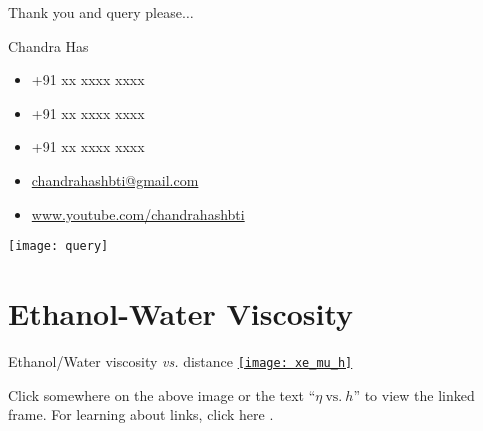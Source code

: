 \documentclass{beamer}
\begin{document}
\begin{frame}{Thank you and query please$\ldots$} 
	\hfill 
	\begin{minipage}[b]{0.5\linewidth}   
		\begin{exampleblock}{Chandra Has}
			\begin{itemize}\scriptsize 
				\item[\faWhatsapp] +91 xx xxxx xxxx
				\item[\faPhone] +91 xx xxxx xxxx
				\item[\faFax] +91 xx xxxx xxxx
				\item[\faEnvelope] \url{chandrahashbti@gmail.com}
				\item[\faYoutube] \url{www.youtube.com/chandrahashbti} 
			\end{itemize}
		\end{exampleblock}
	\end{minipage}
	\hfill 
	\begin{minipage}[b]{0.3\linewidth} 	
		\texttt{[image: query]}
	\end{minipage} 
	\hfill                                                         
\end{frame}	

\appendix

\section*{Ethanol-Water Viscosity}
 
\begin{frame}[c, label=app1]{Ethanol/Water viscosity \textit{vs.} distance}   
	\centering\scriptsize		
	\hyperlink{main}{\texttt{[image: xe\_mu\_h]}}\\	
	\hyperlink{main}{}
	
	\vfill 
	
	\begin{minipage}{0.75\linewidth}
		\color{blue} Click somewhere on the above image or the text ``$\eta\ \text{vs.}\ h$'' to view the linked frame. For learning about links, click here  \href{https://youtu.be/rJatK3nHaLQ}{\faFileMovieO}.
	\end{minipage}
\end{frame}	
\end{document}
